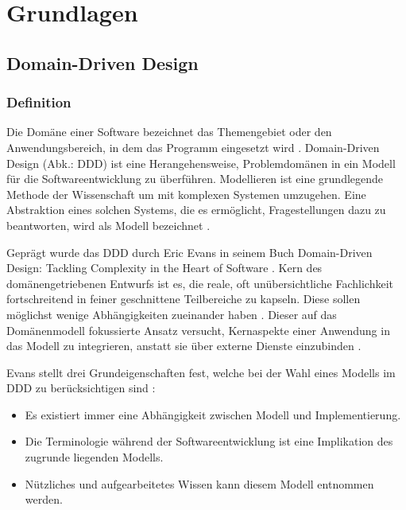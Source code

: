 \chapter{Grundlagen}

%
%

\section{Domain-Driven Design}

\subsection{Definition}

Die Domäne einer Software bezeichnet das Themengebiet oder den Anwendungsbereich, in dem das Programm eingesetzt wird \cite[S.2]{evans} \cite[S.307]{posch}. \glqq Domain-Driven Design\grqq{} (Abk.: DDD) ist eine Herangehensweise, Problemdomänen in ein Modell für die Softwareentwicklung zu überführen. Modellieren ist eine grundlegende Methode der Wissenschaft um mit komplexen Systemen umzugehen. Eine Abstraktion eines solchen Systems, die es ermöglicht, Fragestellungen dazu zu beantworten, wird als Modell bezeichnet \cite{brugge}.

Geprägt wurde das DDD durch Eric Evans in seinem Buch \glqq Domain-Driven Design: Tackling Complexity in the Heart of Software\grqq{} \cite{evans}. Kern des domänengetriebenen Entwurfs ist es, die reale, oft unübersichtliche Fachlichkeit fortschreitend in feiner geschnittene Teilbereiche zu kapseln. Diese sollen möglichst wenige Abhängigkeiten zueinander haben \cite[S.63, 70]{dowalil}. Dieser auf das Domänenmodell fokussierte Ansatz versucht, Kernaspekte einer Anwendung in das Modell zu integrieren, anstatt sie über externe Dienste einzubinden \cite[S.74]{daschner}.

Evans stellt drei Grundeigenschaften fest, welche bei der Wahl eines Modells im DDD zu berücksichtigen sind \cite[S. 3-4]{evans}:
\begin{itemize}
\item Es existiert immer eine Abhängigkeit zwischen Modell und Implementierung.
\item Die Terminologie während der Softwareentwicklung ist eine Implikation des zugrunde liegenden Modells.
\item Nützliches und aufgearbeitetes Wissen kann diesem Modell entnommen werden.
\end{itemize}

